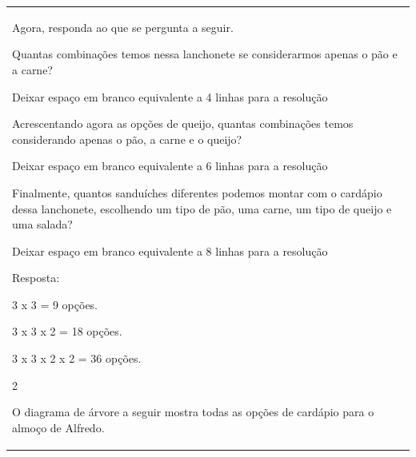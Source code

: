 \begin{mdframed}[linewidth=2pt,linecolor=salmao,roundcorner=2pt]
\begin{escolha}
{{{\begin{longtable}[]{@{}l@{}}
\begin{itemize}
{Agora, responda ao que se pergunta a seguir.

\begin{escolha}
\item
  Quantas combinações temos nessa lanchonete se considerarmos apenas o
  pão e a carne?
\end{escolha}

Deixar espaço em branco equivalente a 4 linhas para a resolução

\begin{escolha}
\item
  Acrescentando agora as opções de queijo, quantas combinações temos
  considerando apenas o pão, a carne e o queijo?
\end{escolha}

Deixar espaço em branco equivalente a 6 linhas para a resolução

\begin{escolha}
\item
  Finalmente, quantos sanduíches diferentes podemos montar com o
  cardápio dessa lanchonete, escolhendo um tipo de pão, uma carne, um tipo de queijo e uma
  salada?
\end{escolha}

Deixar espaço em branco equivalente a 8 linhas para a resolução

Resposta:

\begin{escolha}
\item
  3 x 3 = 9 opções.
\item
  3 x 3 x 2 = 18 opções.
\item
  3 x 3 x 2 x 2 = 36 opções.
\end{escolha}

\num{2}

O diagrama de árvore a seguir mostra todas as opções de cardápio para o
almoço de Alfredo.


}
\end{itemize}
\end{longtable}}}}
\end{escolha}
\end{mdframed}
